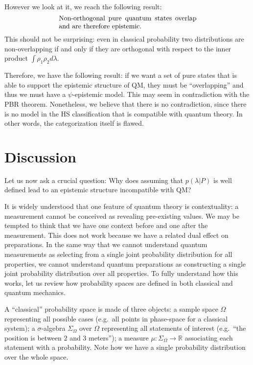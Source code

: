 \documentclass[twocolumn,prl,floatfix,superscriptaddress]{revtex4-2}
\begin{document}
However we look at it, we reach the following result:
\begin{align}\label{conclusion}
	\parbox{2.8in}{Non-orthogonal pure quantum states overlap and are therefore epistemic.}
\end{align}
This should not be surprising: even in classical probability two distributions are non-overlapping if and only if they are orthogonal with respect to the inner product $\int \rho_1 \rho_2 d\lambda$.

Therefore, we have the following result: if we want a set of pure states that is able to support the epistemic structure of QM, they must be ``overlapping'' and thus we must have a $\psi$-epistemic model. This may seem in contradiction with the PBR theorem. Nonetheless, we believe that there is no contradiction, since there is no model in the HS classification that is compatible with quantum theory. In other words, the categorization itself is flawed.

\section{Discussion}

Let us now ask a crucial question: Why does assuming that $p(\lambda|P)$ is well defined lead to an epistemic structure incompatible with QM?

It is widely understood that one feature of quantum theory is contextuality: a measurement cannot be conceived as revealing pre-existing values. We may be tempted to think that we have one context before and one after the measurement. This does not work because we have a related dual effect on preparations. In the same way that we cannot understand quantum measurements as selecting from a single joint probability distribution for all properties, we cannot understand quantum preparations as constructing a single joint probability distribution over all properties. To fully understand how this works, let us review how probability spaces are defined in both classical and quantum mechanics.

A ``classical'' probability space is made of three objects: a sample space $\Omega$ representing all possible cases (e.g.\ all points in phase-space for a classical system); a $\sigma$-algebra $\Sigma_\Omega$ over $\Omega$  representing all statements of interest (e.g.\ ``the position is between 2 and 3 meters''); a measure $\mu : \Sigma_\Omega \to \mathbb{R}$ associating each statement with a probability. Note how we have a single probability distribution over the whole space.
\end{document}
